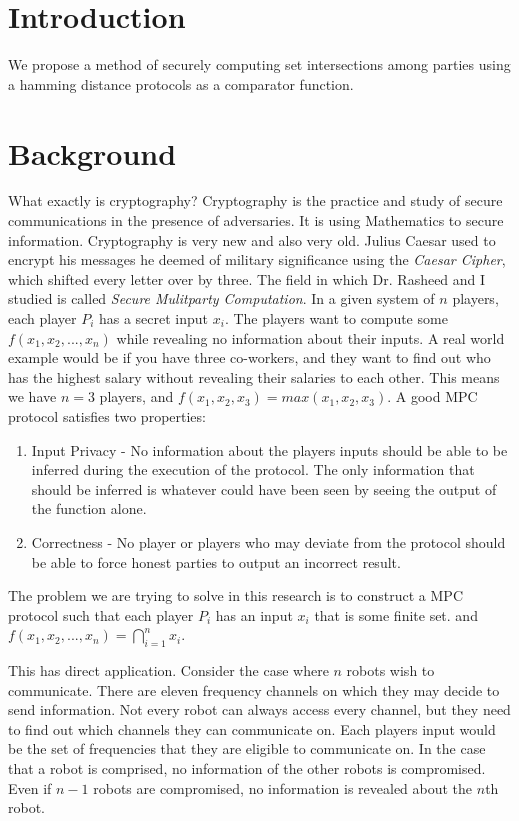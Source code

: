 \documentclass[12pt]{article}
\begin{document}
\newpage

\section{Introduction}
We propose a method of securely computing set intersections among parties using a hamming distance protocols as a comparator function. 
\section{Background}

What exactly is cryptography? Cryptography is the practice and study of secure communications in the presence of adversaries. It is using Mathematics to secure information. Cryptography is very new and also very old. Julius Caesar used to encrypt his messages he deemed of military significance using the \textit{Caesar Cipher}, which shifted every letter over by three. The field in which Dr. Rasheed and I studied is called \textit{Secure Mulitparty Computation}. In a given system of $n$ players, each player $P_i$ has a secret input $x_i$. The players want to compute some $f(x_1,x_2,...,x_n)$ while revealing no information about their inputs. A real world example would be if you have three co-workers, and they want to find out who has the highest salary without revealing their salaries to each other. This means we have $n=3$ players, and $f(x_1,x_2,x_3) = max(x_1,x_2,x_3)$. A good MPC protocol satisfies two properties:
\begin{enumerate}
\item Input Privacy - No information about the players inputs should be able to be inferred during the execution of the protocol. The only information that should be inferred is whatever could have been seen by seeing the output of the function alone.
\item Correctness - No player or players who may deviate from the protocol should be able to force honest parties to output an incorrect result.  
\end{enumerate} 
The problem we are trying to solve in this research is to construct a MPC protocol such that each player $P_i$ has an input $x_i$ that is some finite set. and $f(x_1,x_2,...,x_n) = \bigcap_{i=1}^n x_i$. 

This has direct application. Consider the case where $n$ robots wish to communicate. There are eleven frequency channels on which they may decide to send information. Not every robot can always access every channel, but they need to find out which channels they can communicate on. Each players input would be the set of frequencies that they are eligible to communicate on. In the case that a robot is comprised, no information of the other robots is compromised. Even if $n-1$ robots are compromised, no information is revealed about the $n$th robot.
\end{document}
